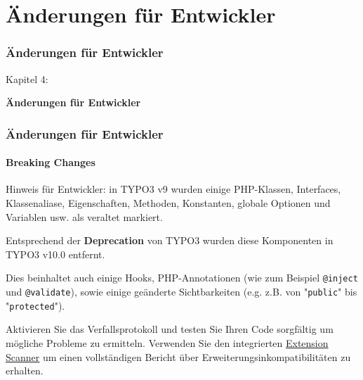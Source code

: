 %

\section{Änderungen für Entwickler}
\begin{frame}[fragile]
	\frametitle{Änderungen für Entwickler}

	\begin{center}\huge{Kapitel 4:}\end{center}
	\begin{center}\huge{\color{typo3darkgrey}\textbf{Änderungen für Entwickler}}\end{center}

\end{frame}


\begin{frame}[fragile]
	\frametitle{Änderungen für Entwickler}
	\framesubtitle{Breaking Changes}

	\small
		Hinweis für Entwickler: in TYPO3 v9 wurden einige PHP-Klassen, Interfaces,
		Klassenaliase, Eigenschaften, Methoden, Konstanten, globale Optionen und Variablen 
		 usw. als veraltet markiert.

		\vspace{0.2cm}

		Entsprechend der \textbf{Deprecation} von TYPO3 wurden diese Komponenten
		in TYPO3 v10.0 entfernt.

		\vspace{0.2cm}

		Dies beinhaltet auch einige Hooks, PHP-Annotationen (wie zum Beispiel \texttt{@inject} und
		\texttt{@validate}), sowie einige geänderte Sichtbarkeiten (e.g. z.B. von
		"\texttt{public}" bis "\texttt{protected}").

		\vspace{0.2cm}

		Aktivieren Sie das Verfallsprotokoll und testen Sie Ihren Code sorgfältig 
		um mögliche Probleme zu ermitteln. Verwenden Sie den integrierten
		\href{https://docs.typo3.org/m/typo3/reference-coreapi/master/en-us/ApiOverview/ExtensionScanner/Index.html}{Extension Scanner} 
		um einen vollständigen Bericht über Erweiterungsinkompatibilitäten zu erhalten.

	\normalsize

\end{frame}

